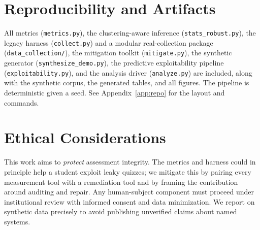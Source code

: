 \documentclass[10pt,twocolumn]{article}
\begin{document}
\section*{Reproducibility and Artifacts}
All metrics (\texttt{metrics.py}), the clustering-aware inference
(\texttt{stats\_robust.py}), the legacy harness (\texttt{collect.py}) and a
modular real-collection package (\texttt{data\_collection/}), the mitigation
toolkit (\texttt{mitigate.py}), the synthetic generator
(\texttt{synthesize\_demo.py}), the predictive exploitability pipeline
(\texttt{exploitability.py}), and the analysis driver (\texttt{analyze.py}) are
included, along with the synthetic corpus, the generated tables, and all figures.
The pipeline is deterministic given a seed. See Appendix~\ref{app:repo} for the
layout and commands.

\section*{Ethical Considerations}
This work aims to \emph{protect} assessment integrity. The metrics and harness
could in principle help a student exploit leaky quizzes; we mitigate this by
pairing every measurement tool with a remediation tool and by framing the
contribution around auditing and repair. Any human-subject component must
proceed under institutional review with informed consent and data
minimization. We report on synthetic data precisely to avoid publishing
unverified claims about named systems.

\appendix
\end{document}
